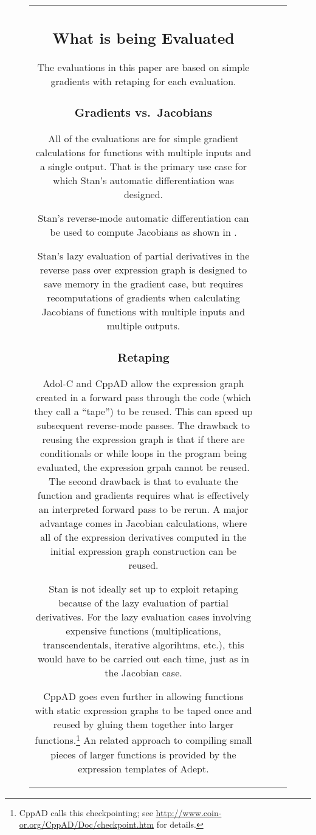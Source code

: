 \documentclass[12pt]{article}
\begin{document}
\begin{figure}
\begin{center}
\begin{tabular}{c||c|cc}
\subsection{What is being Evaluated}\label{retaping.section}

The evaluations in this paper are based on simple gradients with
retaping for each evaluation.

\subsubsection{Gradients vs.\ Jacobians}

All of the evaluations are for simple gradient calculations for
functions  with multiple inputs and a
single output.  That is the primary use case for which Stan's
automatic differentiation was designed.

Stan's reverse-mode automatic differentiation can be used to compute
Jacobians as shown in {jacobians}.

Stan's lazy evaluation of partial derivatives in the reverse pass over
expression graph is designed to save memory in the gradient case, but
requires recomputations of gradients when calculating Jacobians of
functions  with multiple inputs and
multiple outputs.

\subsubsection{Retaping}

Adol-C and CppAD allow the expression graph created in a forward pass
through the code (which they call a ``tape'') to be reused.  This can
speed up subsequent reverse-mode passes.  The drawback to reusing the
expression graph is that if there are conditionals or while loops in
the program being evaluated, the expression grpah cannot be reused.  The
second drawback is that to evaluate the function and gradients
requires what is effectively an interpreted forward pass to be rerun.
A major advantage comes in Jacobian calculations, where all of the
expression derivatives computed in the initial expression graph
construction can be reused.

Stan is not ideally set up to exploit retaping because of the lazy
evaluation of partial derivatives.  For the lazy evaluation cases
involving expensive functions (multiplications, transcendentals,
iterative algorihtms, etc.), this would have to be carried out each
time, just as in the Jacobian case.

CppAD goes even further in allowing functions with static expression
graphs to be taped once and reused by gluing them together into larger
functions.\footnote{CppAD calls this checkpointing; see
  \url{http://www.coin-or.org/CppAD/Doc/checkpoint.htm} for details.}
An related approach to compiling small pieces of larger
functions is provided by the expression templates of Adept.


\end{tabular}
\end{center}
\end{figure}
\end{document}

